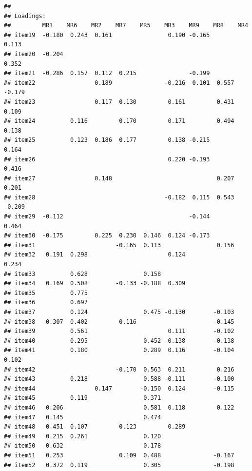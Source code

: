 \documentclass[
  english,
  man]{apa6}
\begin{document}
\begin{verbatim}
## 
## Loadings:
##         MR1    MR6    MR2    MR7    MR5    MR3    MR9    MR8    MR4   
## item19  -0.180  0.243  0.161                0.190 -0.165         0.113
## item20  -0.204                                                   0.352
## item21  -0.286  0.157  0.112  0.215               -0.199              
## item22                 0.189               -0.216  0.101  0.557 -0.179
## item23                 0.117  0.130         0.161         0.431  0.109
## item24          0.116         0.170         0.171         0.494  0.138
## item25          0.123  0.186  0.177         0.138 -0.215         0.164
## item26                                      0.220 -0.193         0.416
## item27                 0.148                              0.207  0.201
## item28                                     -0.182  0.115  0.543 -0.209
## item29  -0.112                                    -0.144         0.464
## item30  -0.175         0.225  0.230  0.146  0.124 -0.173              
## item31                       -0.165  0.113                0.156       
## item32   0.191  0.298                       0.124                0.234
## item33          0.628                0.158                            
## item34   0.169  0.508        -0.133 -0.188  0.309                     
## item35          0.775                                                 
## item36          0.697                                                 
## item37          0.124                0.475 -0.130        -0.103       
## item38   0.307  0.402         0.116                      -0.145       
## item39          0.561                       0.111        -0.102       
## item40          0.295                0.452 -0.138        -0.138       
## item41          0.180                0.289  0.116        -0.104  0.102
## item42                       -0.170  0.563  0.211         0.216       
## item43          0.218                0.588 -0.111        -0.100       
## item44                 0.147        -0.150  0.124        -0.115       
## item45          0.119                0.371                            
## item46   0.206                       0.581  0.118         0.122       
## item47   0.145                       0.474                            
## item48   0.451  0.107         0.123         0.289                     
## item49   0.215  0.261                0.120                            
## item50   0.632                       0.178                            
## item51   0.253                0.109  0.488               -0.167       
## item52   0.372  0.119                0.305               -0.198       

\end{verbatim}
\end{document}
